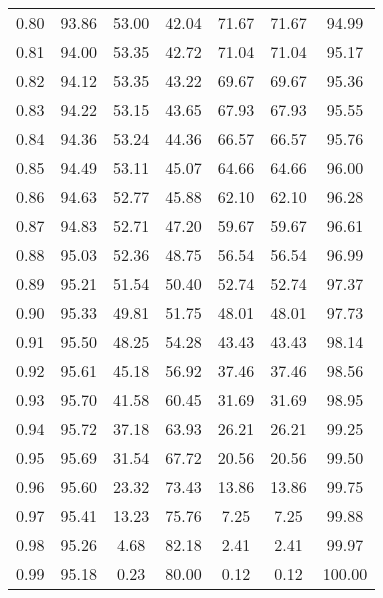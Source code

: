 \begin{tabular}{|c|c|c|c|c|c|c|}
      0.80 &     93.86 &     53.00 &      42.04 &   71.67 &      71.67 &         94.99 \\
      0.81 &     94.00 &     53.35 &      42.72 &   71.04 &      71.04 &         95.17 \\
      0.82 &     94.12 &     53.35 &      43.22 &   69.67 &      69.67 &         95.36 \\
      0.83 &     94.22 &     53.15 &      43.65 &   67.93 &      67.93 &         95.55 \\
      0.84 &     94.36 &     53.24 &      44.36 &   66.57 &      66.57 &         95.76 \\
      0.85 &     94.49 &     53.11 &      45.07 &   64.66 &      64.66 &         96.00 \\
      0.86 &     94.63 &     52.77 &      45.88 &   62.10 &      62.10 &         96.28 \\
      0.87 &     94.83 &     52.71 &      47.20 &   59.67 &      59.67 &         96.61 \\
      0.88 &     95.03 &     52.36 &      48.75 &   56.54 &      56.54 &         96.99 \\
      0.89 &     95.21 &     51.54 &      50.40 &   52.74 &      52.74 &         97.37 \\
      0.90 &     95.33 &     49.81 &      51.75 &   48.01 &      48.01 &         97.73 \\
      0.91 &     95.50 &     48.25 &      54.28 &   43.43 &      43.43 &         98.14 \\
      0.92 &     95.61 &     45.18 &      56.92 &   37.46 &      37.46 &         98.56 \\
      0.93 &     95.70 &     41.58 &      60.45 &   31.69 &      31.69 &         98.95 \\
      0.94 &     95.72 &     37.18 &      63.93 &   26.21 &      26.21 &         99.25 \\
      0.95 &     95.69 &     31.54 &      67.72 &   20.56 &      20.56 &         99.50 \\
      0.96 &     95.60 &     23.32 &      73.43 &   13.86 &      13.86 &         99.75 \\
      0.97 &     95.41 &     13.23 &      75.76 &    7.25 &       7.25 &         99.88 \\
      0.98 &     95.26 &      4.68 &      82.18 &    2.41 &       2.41 &         99.97 \\
      0.99 &     95.18 &      0.23 &      80.00 &    0.12 &       0.12 &        100.00 \\
\bottomrule
\end{tabular}
